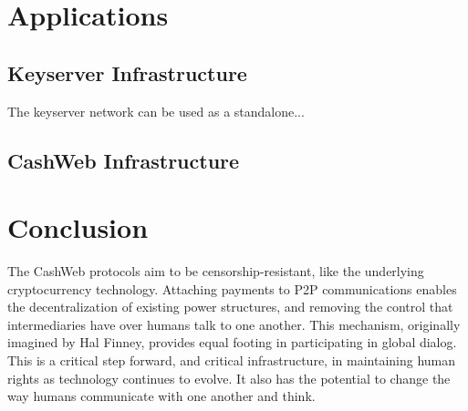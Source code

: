 \documentclass{article}
\begin{document}
\section{Applications}

\subsection{Keyserver Infrastructure}

The keyserver network can be used as a standalone...

\subsection{CashWeb Infrastructure}


\section{Conclusion}

The CashWeb protocols aim to be censorship-resistant, like the underlying cryptocurrency technology. Attaching payments to P2P communications enables the decentralization of existing power structures, and removing the control that intermediaries have over humans talk to one another. This mechanism, originally imagined by Hal Finney\cite{finney2004rpow}, provides equal footing in participating in global dialog. This is a critical step forward, and critical infrastructure, in maintaining human rights as technology continues to evolve. It also has the potential to change the way humans communicate with one another and think.

\cite{nakamoto2008bpp}




\end{document}
